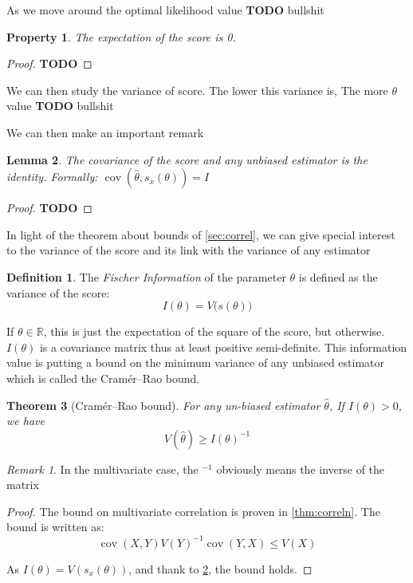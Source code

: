 \documentclass[10pt]{report}
\theoremstyle{plain}
\newtheorem{thm}{Theorem}[chapter]
\newtheorem{prop}[thm]{Property}
\newtheorem{lem}[thm]{Lemma}
\theoremstyle{definition}
\newtheorem{defn}{Definition}[chapter]
\theoremstyle{remark}
\newtheorem*{rem}{Remark}
\newcommand{\R}{\ensuremath{\mathbb{R}}}
\newcommand{\TODO}{\textbf{TODO}}
\renewcommand{\leq}{\leqslant}
\DeclareMathOperator{\cov}{cov}
\begin{document}
As we move around the optimal likelihood value \TODO{} bullshit

\begin{prop} The expectation of the score is 0.
\end{prop}
\begin{proof}
  \TODO{}
\end{proof}

We can then study the variance of score. The lower this variance is, The more
$\theta$ value \TODO{} bullshit

We can then make an important remark

\begin{lem}\label{lem:corscr}
  The covariance of the score and any unbiased estimator is the identity.
  Formally: $\cov(\hat \theta, s_x(\theta)) = I$
\end{lem}

\begin{proof}
  \TODO{}
\end{proof}

In light of the theorem about bounds of \cref{sec:correl}, we can give special
interest to the variance of the score and its link with the variance of any estimator

\begin{defn} The \emph{Fischer Information} of the parameter $\theta$ is defined
  as the variance of the score:
  \[I(\theta) = V\big(s(\theta)\big)\]
\end{defn}

If $\theta \in \R$, this is just the expectation of the square of the score, but
otherwise. $I(\theta)$ is a covariance matrix thus at least positive
semi-definite.
This information value is putting a bound on the minimum variance of any
unbiased estimator which is called the Cramér–Rao bound.

\begin{thm}[Cramér–Rao bound]
  For any un-biased estimator $\hat \theta$, If $I(\theta) > 0$, we have
  \[V(\hat{\theta}) \ge {I(\theta)}^{-1}\]
\end{thm}

\begin{rem}
  In the multivariate case, the ${}^{-1}$ obviously means the inverse of the matrix
\end{rem}

\begin{proof}
  The bound on multivariate correlation is proven in \cref{thm:correln}. The
  bound is written as:
  \[\cov(X,Y){V(Y)}^{-1}\cov(Y,X) \leq V(X)\]

  As $I(\theta) = V(s_x(\theta))$, and thank to \cref{lem:corscr}, the bound holds.
\end{proof}
\end{document}
